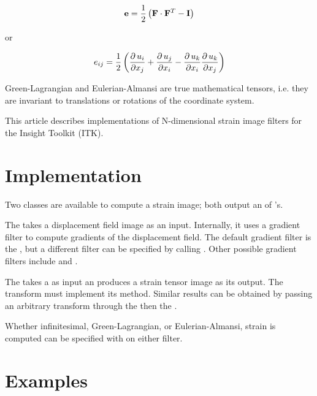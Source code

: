\documentclass{InsightArticle}
\begin{document}
\begin{equation}
\mathbf{e} = {1 \over 2} \left( \mathbf{F} \cdot \mathbf{F}^T - \mathbf{I} \right)
\end{equation}

or

\begin{equation}
e_{ij} = {1 \over 2} \left( {\partial \, u_i \over \partial x_j} + {\partial \, u_j \over \partial x_i} -
                         {\partial \, u_k \over \partial x_i} {\partial \, u_k \over \partial x_j} \right)
\end{equation}

Green-Lagrangian and Eulerian-Almansi are true mathematical tensors, i.e.
they are invariant to translations or rotations of the coordinate system.

This article describes implementations of N-dimensional strain image filters
for the Insight Toolkit (ITK).

\section{Implementation}

Two classes are available to compute a strain image; both output an
 of 's.

The  takes a displacement field image as an input.
Internally, it uses a gradient filter to compute gradients of the displacement
field. The default gradient filter is the , but a
different filter can be specified by calling .
Other possible gradient filters include
 and
.

The  takes a  as input an
produces a strain tensor image as its output. The transform must implement its
 method. Similar results can be
obtained by passing an arbitrary transform through the
 then the
.

Whether infinitesimal, Green-Lagrangian, or Eulerian-Almansi, strain is
computed can be specified with  on either filter.


\section{Examples}
\end{document}
